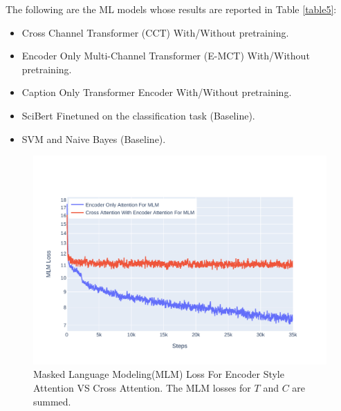The following are the ML models whose results are reported in Table \ref{table5}:
\begin{itemize}
    \item Cross Channel Transformer (CCT) With/Without pretraining. 
    \item Encoder Only Multi-Channel Transformer (E-MCT) With/Without pretraining. 
    \item Caption Only Transformer Encoder With/Without pretraining. 
    \item SciBert Finetuned on the classification task (Baseline). 
    \item SVM and Naive Bayes (Baseline). 
\end{itemize}


\begin{figure}[h]
    \centering
    \includegraphics[width=0.8\maxwidth{\textwidth}]{src/images/mlm-loss-comparison.pdf}
    \caption{Masked Language Modeling(MLM) Loss For Encoder Style Attention VS Cross Attention. The MLM losses for $T$ and $C$ are summed. }
    \label{figure\arabic{figurecounter}}
\end{figure}

